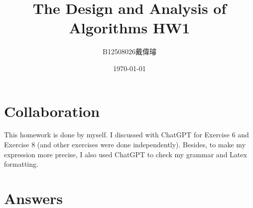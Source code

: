 \documentclass[12pt,a4paper]{article}
\title{The Design and Analysis of Algorithms HW1}
\author{B12508026戴偉璿}
\date{\today}
\begin{document}
\maketitle

\section*{Collaboration}
This homework is done by myself. I discussed with ChatGPT for Exercise 6 and Exercise 8 (and other exercises were done independently). Besides, to make my expression more precise, I also used ChatGPT to check my grammar and Latex formatting.

\section*{Answers}
\end{document}
